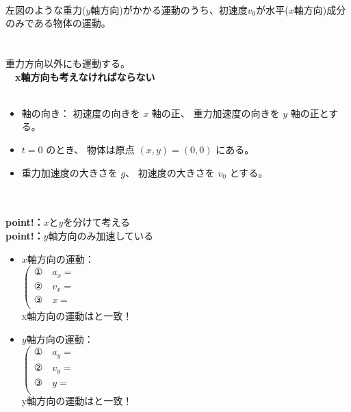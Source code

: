 \documentclass[11pt,twoside]{article}
\begin{document}
	\begin{minipage}[t]{0.58\linewidth}
		
		\\
		左図のような重力($y$軸方向)がかかる運動のうち、初速度$v_0$が水平($x$軸方向)成分のみである物体の運動。\\\\
		\\
		重力方向以外にも運動する。\\
		　\to \textbf{x軸方向も考えなければならない}\\\\
			\begin{itemize}[leftmargin=2em,itemsep=0pt,topsep=2pt]
				\item[(i)]
				軸の向き：
				初速度の向きを $x$ 軸の正、
				重力加速度の向きを $y$ 軸の正とする。

				\item[(ii)]
				$t=0$ のとき、
				物体は原点 $(x,y)=(0,0)$ にある。

				\item[(iii)]
				重力加速度の大きさを $g$、
				初速度の大きさを $v_0$ とする。
			\end{itemize}
			　\\
		　\\
		\textbf{point!：}$x$と$y$を分けて考える\\
		\textbf{point!：}$y$軸方向のみ加速している
		\begin{itemize}[leftmargin=2em,itemsep=0pt,topsep=2pt]
			\item[(i)]
			$x$軸方向の運動：\\
			\(
			\left(
			\begin{array}{ll}
				\text{①} \quad a_x = & \\
				\text{②} \quad v_x = & \\
				\text{③} \quad x = & \\
			\end{array}
			\right.
			\)\\
			\to x軸方向の運動は\underline{\hspace{3.5cm}}と一致！\\
			\item[(ii)]
			$y$軸方向の運動：\\
			\(
			\left(
			\begin{array}{ll}
				\text{①} \quad a_y = & \\
				\text{②} \quad v_y = & \\
				\text{③} \quad y = & \\
			\end{array}
			\right.
			\)\\
			\to y軸方向の運動は\underline{\hspace{3.5cm}}と一致！
		\end{itemize}
	\end{minipage}
\newpage
\end{document}
